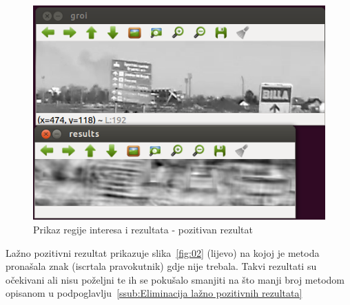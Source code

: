 \begin{figure}[h]
\centering
\includegraphics[scale=0.5]{figures/01.png}
\caption{Prikaz regije interesa i rezultata - pozitivan rezultat}
\label{fig:01}
\end{figure}

Lažno pozitivni rezultat prikazuje slika~\ref{fig:02} (lijevo) na kojoj 
je metoda
pronašala znak (iscrtala pravokutnik) gdje nije trebala. Takvi rezultati su očekivani ali nisu
poželjni te ih se pokušalo smanjiti na što manji broj metodom opisanom 
u podpoglavlju~\ref{ssub:Eliminacija lažno pozitivnih rezultata}

